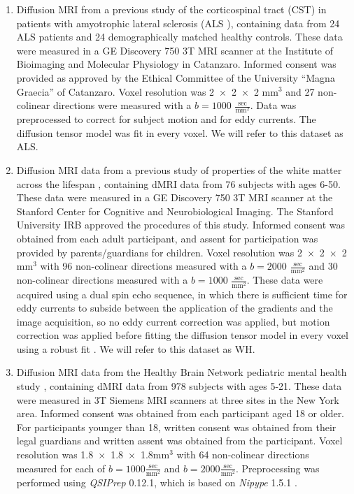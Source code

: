 \documentclass[10pt,%
               aps,%
               prl,%
               reprint,%
               superscriptaddress,%
               preprintnumbers,%
               linenumbers,%
               amsmath,%
               floatfix]{revtex4-2}
\begin{document}
\begin{enumerate}

\item Diffusion MRI from a previous study of the corticospinal
tract (CST) in patients with amyotrophic lateral sclerosis
(ALS \cite{sarica2017corticospinal}), containing data from 24 ALS
patients and 24 demographically matched healthy controls. These data
were measured in a GE Discovery 750 3T MRI scanner at the Institute
of Bioimaging and Molecular Physiology in Catanzaro. Informed consent
was provided as approved by the Ethical Committee of the University
``Magna Graecia'' of Catanzaro. Voxel resolution was \num{2x2x2}
$\text{mm}^3$ and 27 non-colinear directions were measured with a
$b=1000$ $\frac{\text{sec}}{\text{mm}^2}$. Data was preprocessed to
correct for subject motion and for eddy currents. The diffusion tensor
model \cite{basser1994mr} was fit in every voxel.
We will refer to this dataset as ALS.

\item Diffusion MRI data from a previous study of properties of
the white matter across the lifespan \cite{yeatman2014lifespan},
containing dMRI data from 76 subjects with ages 6-50. These data were
measured in a GE Discovery 750 3T MRI scanner at the Stanford Center
for Cognitive and Neurobiological Imaging. The Stanford University
IRB approved the procedures of this study. Informed consent was
obtained from each adult participant, and assent for participation
was provided by parents/guardians for children. Voxel resolution was
\num{2x2x2}$\text{mm}^3$ with 96 non-colinear directions measured with a
$b=2000$ $\frac{\text{sec}}{\text{mm}^2}$ and 30 non-colinear directions
measured with a $b=1000$ $\frac{\text{sec}}{\text{mm}^2}$. These data
were acquired using a dual spin echo sequence, in which there is
sufficient time for eddy currents to subside between the application of
the gradients and the image acquisition, so no eddy current correction
was applied, but motion correction was applied before fitting the
diffusion tensor model \cite{basser1994mr} in every voxel using a robust
fit \cite{chang2005restore}. We will refer to this dataset as WH.

\item Diffusion MRI data from the Healthy Brain Network pediatric mental
health study \cite{alexander2017open}, containing dMRI data from 978 subjects
with ages 5-21. These data were measured in 3T Siemens MRI scanners at three
sites in the New York area. Informed consent was obtained from each
participant aged 18 or older. For participants younger than 18, written
consent was obtained from their legal guardians and written assent was
obtained from the participant. Voxel resolution was
\num{1.8x1.8x1.8}$\text{mm}^3$ with 64 non-colinear directions measured for
each of $b=1000 \frac{\text{sec}}{\text{mm}^2}$ and $b=2000
\frac{\text{sec}}{\text{mm}^2}$.
Preprocessing was performed using \emph{QSIPrep} 0.12.1, which is based on
\emph{Nipype} 1.5.1 \cite[RRID:SCR\_002502]{nipype1,nipype2}.


\end{enumerate}
\end{document}
